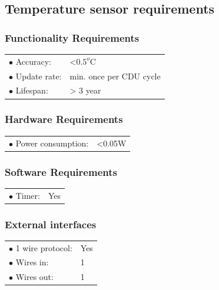 \subsection{Temperature sensor requirements}

\subsubsection{Functionality Requirements}
\begin{table}[H]
\begin{tabular}{p{8cm} p{5cm}}
$\bullet$ Accuracy: & <$0.5^o$C\\
$\bullet$ Update rate: & min. once per CDU cycle\\
$\bullet$ Lifespan: & > 3 year\\
\end{tabular}
\end{table}

\subsubsection{Hardware Requirements}
\begin{table}[H]
\begin{tabular}{p{8cm} p{2cm}}
$\bullet$ Power consumption: & <0.05W\\


\end{tabular}
\end{table}


\subsubsection{Software Requirements}
\begin{table}[H]
\begin{tabular}{p{8cm} p{2cm}}
$\bullet$ Timer: & Yes\\


\end{tabular}
\end{table}


\subsubsection{External interfaces}
\begin{table}[H]
\begin{tabular}{p{8cm} p{2cm}}
$\bullet$ 1 wire protocol: & Yes\\
$\bullet$ Wires in: & 1\\
$\bullet$ Wires out: & 1\\
\end{tabular}
\end{table}

